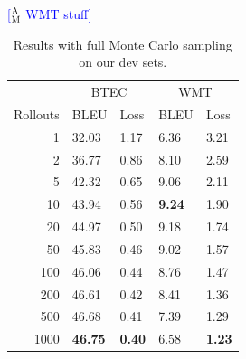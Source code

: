 \documentclass[11pt,a4paper]{article}
\newcommand{\ensuretext}[1]{#1}
\newcommand{\mycomment}[3]{\ensuretext{\textcolor{#3}{[#1 #2]}}}
\newcommand{\ammarker}{\ensuretext{\textcolor{blue}{\ensuremath{^{\textsc{A}}_{\textsc{M}}}}}}
\newcommand{\am}[1]{\mycomment{\ammarker}{#1}{blue}}
\begin{document}

\am{WMT stuff}

\begin{table}
\centering
\begin{tabular}{r l l l l}
\toprule
& \multicolumn{2}{c}{BTEC} & \multicolumn{2}{c}{WMT} \\
\cmidrule(l{2pt}r{2pt}){2-3}\cmidrule(l{2pt}r{2pt}){4-5}
Rollouts & BLEU & Loss & BLEU & Loss \\
\midrule
1 & 32.03 & 1.17 & 6.36 & 3.21 \\
2 & 36.77 & 0.86 & 8.10 & 2.59 \\
5 & 42.32 & 0.65 & 9.06 & 2.11 \\
10 & 43.94 & 0.56 & \textbf{9.24} & 1.90 \\
20 & 44.97 & 0.50 & 9.18 & 1.74 \\
50 & 45.83 & 0.46 & 9.02 & 1.57 \\
100 & 46.06 & 0.44 & 8.76 & 1.47 \\
200 & 46.61 & 0.42 & 8.41 & 1.36 \\
500 & 46.68 & 0.41 & 7.39 & 1.29 \\
1000 & \textbf{46.75} & \textbf{0.40} & 6.58 & \textbf{1.23} \\
\bottomrule
\end{tabular}
\caption{Results with full Monte Carlo sampling on our dev sets.}
\label{tab:monte_carlo}
\end{table}
\end{document}

